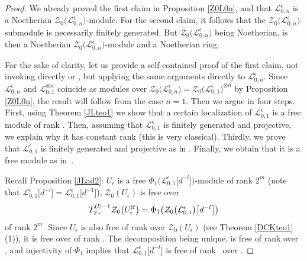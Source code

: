 \documentclass[pdftex]{sigma}
\numberwithin{equation}{section}
\theoremstyle{definition}
\newcommand{\e}{\epsilon}
\newcommand{\Ll}{{\mathcal L}}
\begin{document}
\begin{proof} We already proved the first claim in Proposition \ref{Z0L0n}, and that $\Ll_{0,n}^\e$ is a Noetherian $\mathcal{Z}_0\bigl(\Ll_{0,n}^\e\bigr)$-module. For the second claim, it follows that the $\mathcal{Z}_0\bigl(\Ll_{0,n}^\e\bigr)$-submodule \smash{$\bigl(\Ll_{0,n}^\e\bigr)^{U_\e}$} is necessarily finitely generated. But $\mathcal{Z}_0\bigl(\Ll_{0,n}^\e\bigr)$ being Noetherian, \smash{$\bigl(\Ll_{0,n}^\e\bigr)^{U_\e}$} is then a Noetherian $\mathcal{Z}_0\bigl(\Ll_{0,n}^\e\bigr)$-module and a Noetherian ring.

For the sake of clarity, let us provide a self-contained proof of the first claim, not invoking directly \cite{BGS,DC-L} or \cite{AnGa,BC}, but applying the same arguments directly to $\Ll_{0,n}^\e$. Since $\Ll_{0,n}^\e$ and $\Ll_{0,1}^{\otimes n}$ coincide as modules over $\mathcal{Z}_0\bigl(\Ll_{0,n}^\e\bigr)=\mathcal{Z}_0\bigl(\Ll_{0,1}^\e\bigr)^{\otimes n}$ by Proposition \ref{Z0L0n}, the result will follow from the case $n=1$. Then we argue in four steps. First, using Theorem \ref{JLteo1} we show that a certain localization of $\Ll_{0,1}^\e$ is a free module of rank . Then, assuming that $\Ll_{0,1}^\e$ is finitely generated and projective, we explain why it has constant rank  (this is very classical). Thirdly, we prove that $\Ll_{0,1}^\e$ is finitely generated and projective as in \cite[Theorem 7.2]{DC-L}. Finally, we obtain that it is a free module as in~\cite{BGS}.

Recall Proposition \ref{JLad2}: $U_\e$ is a free $\Phi_1\big(\Ll_{0,1}^\e\big[d^{-l}\big]\big)$-module of rank $2^m$ \big(note that $\Ll_{0,1}^\e\big[d^{-l}\big]=\Ll_{0,1}^\e\big[d^{-1}\big]$\big), $\mathcal{Z}_0(U_\e)$ is free over
\[
T_{2-}^{(l)-1}\mathcal{Z}_0\big(U_\e^{\rm lf}\big) = \Phi_1\big(\mathcal{Z}_0\bigl(\Ll_{0,1}^\e\bigr)\big[d^{-l}\big]\big)
\]
 of rank $2^m$. Since $U_\e$ is also free of rank  over $\mathcal{Z}_0(U_\e)$ (see Theorem \ref{DCKteo1}\,(1)), it is free over \smash{$\Phi_1\big(\mathcal{Z}_0\bigl(\Ll_{0,1}^\e\bigr)\big[d^{-l}\big]\big)$} of rank . The decomposition being unique, \smash{$\Phi_1\big(\Ll_{0,1}^\e\big[d^{-l}\big]\big)$} is free of rank  over \smash{$\Phi_1\big(\mathcal{Z}_0\bigl(\Ll_{0,1}^\e\bigr)\big[d^{-l}\big]\big)$}, and injectivity of $\Phi_1$ implies that $\Ll_{0,1}^\e\big[d^{-l}\big]$ is free of rank~ over \smash{$\mathcal{Z}_0\bigl(\Ll_{0,1}^\e\bigr)\big[d^{-l}\big]$}.


\end{proof}
\end{document}
